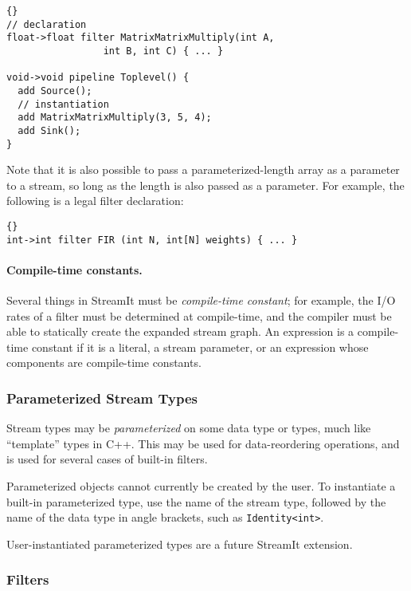 \documentclass[11pt]{article}
\newcommand{\old}{\marginpar{\footnotesize \textbf{~~--~Old~--}}}
\begin{document}
\begin{lstlisting}{}
// declaration
float->float filter MatrixMatrixMultiply(int A,
                 int B, int C) { ... }

void->void pipeline Toplevel() {
  add Source();
  // instantiation
  add MatrixMatrixMultiply(3, 5, 4);
  add Sink();
}
\end{lstlisting}

Note that it is also possible to pass a parameterized-length array as
a parameter to a stream, so long as the length is also passed as a
parameter. For example, the following is a legal filter declaration:

\begin{lstlisting}{}
int->int filter FIR (int N, int[N] weights) { ... }
\end{lstlisting}

\paragraph{Compile-time constants.}  Several things in StreamIt must
be \emph{compile-time constant}; for example, the I/O rates of a
filter must be determined at {\old} compile-time, and the compiler must be
able to statically create the expanded stream graph.  An expression is a
compile-time constant if it is a literal, a stream parameter, or an
expression whose components are compile-time constants.

\subsubsection{Parameterized Stream Types}

Stream types may be \emph{parameterized} on some data type or types,
much like ``template'' types in C++.  This may be used for
data-reordering operations, and is used for several cases of built-in
filters.

Parameterized objects cannot currently be created by the user.  To
instantiate a built-in parameterized type, use the name of the stream
type, followed by the name of the data type in angle brackets, such as
\lstinline|Identity<int>|.

\begin{note}
User-instantiated parameterized types are a future StreamIt
extension.
\end{note}

\subsubsection{Filters}
\end{document}
